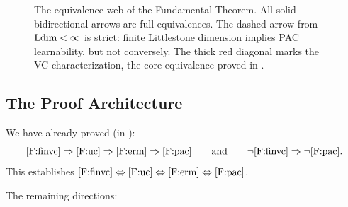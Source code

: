 \begin{figure}[ht]
\caption{The equivalence web of the Fundamental Theorem.  All solid
bidirectional arrows are full equivalences.  The dashed arrow from
$\mathrm{Ldim} < \infty$ is strict: finite Littlestone dimension implies PAC
learnability, but not conversely.  The thick red diagonal marks the VC
characterization, the core equivalence proved in
.}
\label{fig:equivalence-web}
\end{figure}


\subsection{The Proof Architecture}
\label{sec:proof-architecture}

We have already proved (in ):
\[
  \ref{F:finvc} \Rightarrow \ref{F:uc} \Rightarrow \ref{F:erm}
  \Rightarrow \ref{F:pac}
  \qquad\text{and}\qquad
  \neg\ref{F:finvc} \Rightarrow \neg\ref{F:pac}.
\]
This establishes
$\ref{F:finvc} \Leftrightarrow \ref{F:uc} \Leftrightarrow \ref{F:erm}
\Leftrightarrow \ref{F:pac}$.

The remaining directions:

